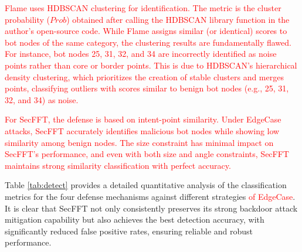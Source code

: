 \documentclass[lettersize,journal]{IEEEtran}
\begin{document}
\textcolor{red}{Flame uses HDBSCAN clustering for identification. The metric is the cluster probability ($Prob$) obtained after calling the HDBSCAN library function in the author's open-source code. While Flame assigns similar (or identical) scores to bot nodes of the same category, the clustering results are fundamentally flawed. For instance, bot nodes 25, 31, 32, and 34 are incorrectly identified as noise points rather than core or border points. This is due to HDBSCAN's hierarchical density clustering, which prioritizes the creation of stable clusters and merges points, classifying outliers with scores similar to benign bot nodes (e.g., 25, 31, 32, and 34) as noise.}

\textcolor{red}{For SecFFT, the defense is based on intent-point similarity. Under EdgeCase attacks, SecFFT accurately identifies malicious bot nodes while showing low similarity among benign nodes. The size constraint has minimal impact on SecFFT's performance, and even with both size and angle constraints, SecFFT maintains strong similarity classification with perfect accuracy.}

Table \ref{tab:detect} provides a detailed quantitative analysis of the classification metrics for the four defense mechanisms against different strategies \textcolor{red}{of EdgeCase}. It is clear that SecFFT not only consistently preserves its strong backdoor attack mitigation capability but also achieves the best detection accuracy, with significantly reduced false positive rates, ensuring reliable and robust performance.


\end{document}
